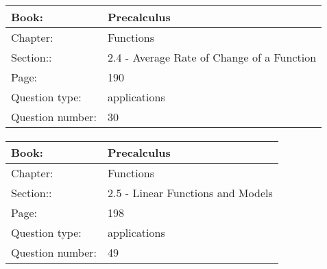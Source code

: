 \documentclass{article}
\begin{document}
        
            \paragraph{}
            \begin{tabularx}{1\textwidth}{
                    p{}
                    p{}
                }
                \toprule
                Book: & Precalculus
                \\
                \midrule
                Chapter: & Functions
                \\
                \midrule
                Section:: & 2.4 - Average Rate of Change of a Function
                \\
                \midrule
                Page: & 190
                \\
                \midrule
                Question type: & applications
                \\
                \midrule
                Question number: & 30
                \\
                \bottomrule
            \end{tabularx}
            
            \paragraph{}
            \begin{tabularx}{1\textwidth}{
                    p{}
                    p{}
                }
                \toprule
                Book: & Precalculus
                \\
                \midrule
                Chapter: & Functions
                \\
                \midrule
                Section:: & 2.5 - Linear Functions and Models
                \\
                \midrule
                Page: & 198
                \\
                \midrule
                Question type: & applications
                \\
                \midrule
                Question number: & 49
                \\
                \bottomrule
            \end{tabularx}
            
\end{document}

